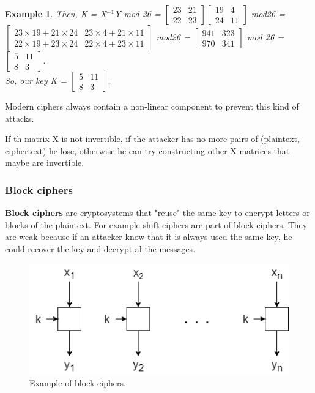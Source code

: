 \documentclass[a4paper, 12pt]{report}
\newtheorem{example}{\textbf{Example}}
\begin{document}
\begin{example}
	\vspace{5mm}
	Then, K = X$^{-1}$Y mod 26 = $\begin{bmatrix}
		23 & 21\\
		22 & 23	
	\end{bmatrix} \begin{bmatrix}
	19 & 4\\
	24 & 11	
	\end{bmatrix}$ mod26 = $\begin{bmatrix}
		23\times19+21\times24 & 23\times4+21\times11\\
		22\times19+23\times24 & 22\times4+23\times11	
	\end{bmatrix}$ mod26 = $\begin{bmatrix}
		941 & 323\\
		970 & 341	
	\end{bmatrix}$ mod 26 = $\begin{bmatrix}
		5 & 11\\
		8 & 3	
	\end{bmatrix}$.\\
	
	So, our key K = $\begin{bmatrix}
		5 & 11\\
		8 & 3	
	\end{bmatrix}$.
\end{example}

Modern ciphers always contain a non-linear component to prevent this kind of attacks.

If th matrix X is not invertible, if the attacker has no more pairs of (plaintext, ciphertext) he lose, otherwise he can try constructing other X matrices that maybe are invertible.

\subsubsection{Block ciphers}
\textbf{Block ciphers} are cryptosystems that "reuse" the same key to encrypt letters or blocks of the plaintext. For example shift ciphers are part of block ciphers. They are weak because if an attacker know that it is always used the same key, he could recover the key and decrypt al the messages.

\begin{figure}[H]
	\centering
	\includegraphics[scale=0.6]{images/Lec4/blockciphers.png}
	\caption{Example of block ciphers.}
	\label{fig:blockciphers}
\end{figure}
\end{document}
